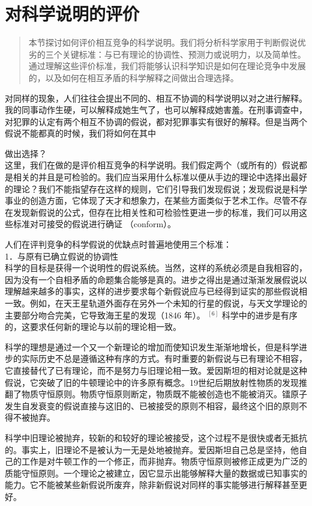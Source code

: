 \section{对科学说明的评价}

\begin{quotation}
本节探讨如何评价相互竞争的科学说明。我们将分析科学家用于判断假说优劣的三个关键标准：与已有理论的协调性、预测力或说明力，以及简单性。通过理解这些评价标准，我们将能够认识科学知识是如何在理论竞争中发展的，以及如何在相互矛盾的科学解释之间做出合理选择。
\end{quotation}

对同样的现象，人们往往会提出不同的、相互不协调的科学说明以对之进行解释。我的同事动作生硬，可以解释成她生气了，也可以解释成她害羞。在刑事调查中，对犯罪的认定有两个相互不协调的假说，都对犯罪事实有很好的解释。但是当两个假说不能都真的时候，我们将如何在其中

做出选择？\\
这里，我们在做的是评价相互竞争的科学说明。我们假定两个（或所有的）假说都是相关的并且是可检验的。我们应当采用什么标准以便从手边的理论中选择出最好的理论？我们不能指望存在这样的规则，它们引导我们发现假说；发现假说是科学事业的创造方面，它体现了天才和想象力，在某些方面类似于艺术工作。尽管不存在发现新假说的公式，但存在比相关性和可检验性更进一步的标准，我们可以用这些标准对可接受的假说进行确证 （conform）。

人们在评判竞争的科学假说的优缺点时普遍地使用三个标准：\\
1．与原有已确立假说的协调性\\
科学的目标是获得一个说明性的假说系统。当然，这样的系统必须是自我相容的，因为没有一个自相矛盾的命题集合能够是真的。进步之得出是通过渐渐发展假说以理解越来越多的事实，这样的进步要求每个新假说应与已经得到证实的那些假说相一致。例如，在天王星轨道外面存在另外一个未知的行星的假说，与天文学理论的主要部分吻合完美，它导致海王星的发现（1846 年）。 ${ }^{[6]}$ 科学中的进步是有序的，这要求任何新的理论与以前的理论相一致。

科学的理想是通过一个又一个新理论的增加而使知识发生渐渐地增长，但是科学进步的实际历史不总是遵循这种有序的方式。有时重要的新假说与已有理论不相容，它直接替代了已有理论，而不是努力与旧理论相一致。爱因斯坦的相对论就是这种假说，它突破了旧的牛顿理论中的许多原有概念。19世纪后期放射性物质的发现推翻了物质守恒原则。物质守恒原则断定，物质既不能被创造也不能被消灭。镭原子发生自发衰变的假说直接与这旧的、已被接受的原则不相容，最终这个旧的原则不得不被抛弃。

科学中旧理论被抛弃，较新的和较好的理论被接受，这个过程不是很快或者无抵抗的。事实上，旧理论不是被认为一无是处地被抛弃。爱因斯坦自己总是坚持，他自己的工作是对牛顿工作的一个修正，而非抛弃。物质守恒原则被修正成更为广泛的质能守恒原则。一个理论之被建立，因它显示出能够解释大量的数据或已知事实的能力。它不能被某些新假说所废弃，除非新假说对同样的事实能够进行解释甚至更好。

